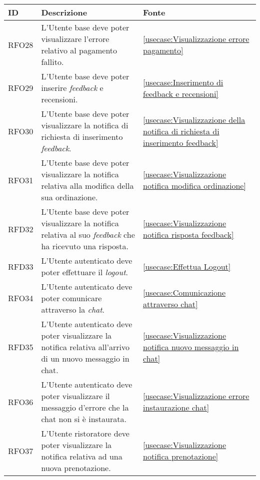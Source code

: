 \begin{table}[H]
	\renewcommand{\arraystretch}{1.5}
	\centering
	\begin{tabularx}{\textwidth}{l|X|p{2cm}}
		\textbf{ID} & \textbf{Descrizione}                                                                                                      & \textbf{Fonte} \\
		\hline
		RFO28       & L'Utente base deve poter visualizzare l'errore relativo al pagamento fallito.											 &  \autoref{usecase:Visualizzazione errore pagamento}           \\
		\hline
		RFO29       & L'Utente base deve poter inserire \textit{feedback} e recensioni.												        &  \autoref{usecase:Inserimento di feedback e recensioni}           \\
		\hline
		RFO30       & L'Utente base deve poter visualizzare la notifica di richiesta di inserimento \textit{feedback}.                               &  \autoref{usecase:Visualizzazione della notifica di richiesta di inserimento feedback}           \\
		\hline
		RFO31       & L'Utente base deve poter visualizzare la notifica relativa alla modifica della sua ordinazione.                      			& \autoref{usecase:Visualizzazione notifica modifica ordinazione}            \\
		\hline
		RFD32       & L'Utente base deve poter visualizzare la notifica relativa al suo \textit{feedback} che ha ricevuto una risposta.           & \autoref{usecase:Visualizzazione notifica risposta feedback}               \\
		\hline
		RFD33       & L'Utente autenticato deve poter effettuare il \textit{logout}.     															&  \autoref{usecase:Effettua Logout}           \\
		\hline
		RFO34       & L'Utente autenticato deve poter comunicare attraverso la \textit{chat}.        												& \autoref{usecase:Comunicazione attraverso chat}            \\
		\hline
		RFD35       & L'Utente autenticato deve poter visualizzare la notifica relativa all'arrivo di un nuovo messaggio in chat. 					&  \autoref{usecase:Visualizzazione notifica nuovo messaggio in chat}           \\
		\hline
		RFO36       & L'Utente autenticato deve poter visualizzare il messaggio d'errore che la chat non si è instaurata.						    & \autoref{usecase:Visualizzazione errore instaurazione chat}            \\
		\hline
		RFO37       & L'Utente ristoratore deve poter visualizzare la notifica relativa ad una nuova prenotazione.   								&  \autoref{usecase:Visualizzazione notifica prenotazione}           \\

\end{tabularx}
\end{table}
